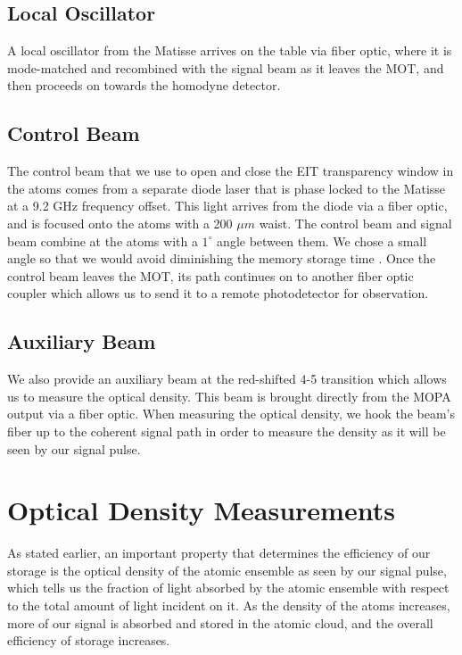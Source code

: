 \subsection{Local Oscillator}

A local oscillator from the Matisse arrives on the table via fiber optic, where it is mode-matched and recombined with the signal beam as it leaves the MOT, and then proceeds on towards the homodyne detector.


\subsection{Control Beam}

The control beam that we use to open and close the EIT transparency window in the atoms comes from a separate diode laser that is phase locked to the Matisse at a 9.2 GHz frequency offset.  This light arrives from the diode via a fiber optic, and is focused onto the atoms with a 200 $\mu m$ waist.  The control beam and signal beam combine at the atoms with a $1^\circ$ angle between them.  We chose a small angle so that we would avoid diminishing the memory storage time \cite{zhao2008millisecond}.  Once the control beam leaves the MOT, its path continues on to another fiber optic coupler which allows us to send it to a remote photodetector for observation.  


\subsection{Auxiliary Beam}

We also provide an auxiliary beam at the red-shifted 4-5 transition which allows us to measure the optical density.  This beam is brought directly from the MOPA output via a fiber optic.  When measuring the optical density, we hook the beam's fiber up to the coherent signal path in order to measure the density as it will be seen by our signal pulse.



\section{Optical Density Measurements}

As stated earlier, an important property that determines the efficiency of our
storage is the optical density of the atomic ensemble as seen by our signal
pulse, which tells us the fraction of light absorbed by the atomic ensemble with
respect to the total amount of light incident on it.  As the density of the atoms increases, more of our signal is absorbed and stored in the atomic cloud, and the overall efficiency of storage increases.  

